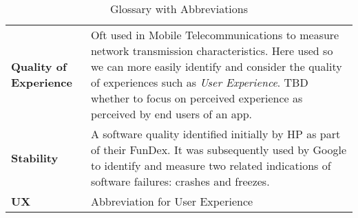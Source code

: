 \begin{table}
{\begin{tabular}{@{}>{\bfseries}p{5.3cm}p{9.2cm}@{}}
Quality of Experience & Oft used in Mobile Telecommunications to measure network transmission characteristics. Here used so we can more easily identify and consider the quality of experiences such as \emph{User Experience}. TBD whether to focus on perceived experience as perceived by end users of an app.\\

Stability &A software quality identified initially by HP as part of their FunDex. It was subsequently used by Google to identify and measure two related indications of software failures: crashes and freezes. \\ %

UX & Abbreviation for User Experience \\
\end{tabular}}
\caption{Glossary with Abbreviations}
\end{table}


\clearpage
